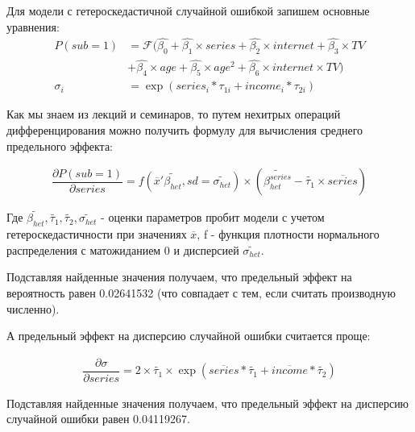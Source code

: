 \documentclass[a4paper,12pt]{article}
\begin{document}
	\vspace{0.2cm}
	
	Для модели с гетероскедастичной случайной ошибкой запишем основные уравнения:
	\begin{align*}
			P(sub=1)&= \mathcal{F} (\hat{\beta_0} + \hat{\beta_1} \times series+ \hat{\beta_2} \times internet  +\hat{\beta_3}  \times TV \\&+ \hat{\beta_4} \times age+ \hat{\beta_5}\times age^2 +\hat{\beta_6} \times internet \times TV) \\[0.3cm]
			\sigma_i &= \exp(series_i*\tau_{1i}+ income_i* \tau_{2i})
	\end{align*}
	
	Как мы знаем из лекций и семинаров, то путем нехитрых операций дифференцирования можно получить формулу для вычисления среднего предельного эффекта:
	
	\begin{align*}
		\dfrac{\partial P(sub=1)}{\partial series} = f(\overline{x}'\widetilde{\beta_{het}}, sd = \widetilde{\sigma_{het}}) \times (\widetilde{\beta^{series}_{het}} -\widetilde{\tau_{1}}\times\overline{series}
		)
	\end{align*}
	
	Где $\widetilde{\beta_{het}}, \widetilde{\tau_{1}},\widetilde{\tau_{2}}, \widetilde{\sigma_{het}}$ - оценки параметров пробит модели с учетом гетероскедастичности при значениях $\overline{x}$, f - функция плотности нормального распределения с матожиданием 0 и дисперсией $\widetilde{\sigma_{het}}$.
	
	Подставляя найденные значения получаем, что предельный эффект на вероятность равен 0.02641532 (что совпадает с тем, если считать производную численно).
	
	А предельный эффект на дисперсию случайной ошибки считается проще:
	
	\begin{align*}
		\dfrac{\partial \sigma}{\partial series} = 2\times\widetilde{\tau_{1}}\times \exp(\overline{series}*\widetilde{\tau_{1}}+ \overline{income}*\widetilde{\tau_{2}})
	\end{align*}

	Подставляя найденные значения получаем, что предельный эффект на дисперсию случайной ошибки равен 0.04119267.
\end{document}
